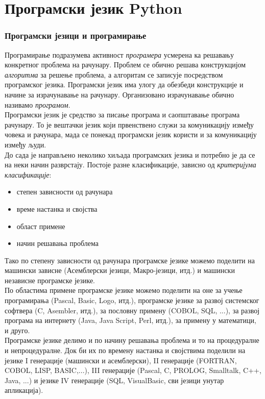 \section{Програмски језик Python}
		\subsubsection{Програмски језици и програмирање}
		Програмирање подразумева активност \emph{програмера} усмерена ка решавању конкретног проблема на рачунару. Проблем се обично решава конструкцијом \emph{алгоритма} за решење проблема, а алгоритам се записује посредством програмског језика. Програмски језик има улогу да обезбеди конструкције и начине за израчунавање на рачунару. Организовано израчунавање обично називамо \emph{програмом}.\\
		Програмски језик је средство за писање програма и саопштавање програма рачунару. То је вештачки језик који првенствено служи за комуникацију између човека и рачунара, мада се понекад програмски језик користи и за комуникацију између људи.\\
		 		До сада је направљено неколико хиљада програмских језика и потребно је да се на неки начин разврстају. Постоје разне класификације, зависно од \emph{критеријума класификације}:
		\begin{itemize}
		\item степен зависности од рачунара
		\item време настанка и својства
		\item област примене
		\item начин решавања проблема
		\end{itemize}
		Тако по степену зависности од рачунара програмске језике можемо поделити на машински зависне (Асемблерски језици, Макро-језици, итд.) и машински независне програмске језике.\\
		По областима примене програмске језике можемо поделити на оне за учење програмирања (Pascal, Basic, Logo, итд.), програмске језике за развој системског софтвера (C, Asembler, итд.), за пословну примену (COBOL, SQL, ...), за развој програма на интернету (Java, Java Script, Perl, итд.), за примену у математици, и друго.\\
		Програмске језике делимо и по начину решавања проблема и то на процедуралне и непроцедуралне. Док би их по времену настанка и својствима поделили на језике I генерације (машински и асемблерски), II генерације (FORTRAN, COBOL, LISP, BASIC,...), III генерације (Pascal, C, PROLOG, Smalltalk, C++, Java, ...) и језике IV генерације (SQL, VisualBasic, сви језици унутар апликација).\cite{tosic}\\

